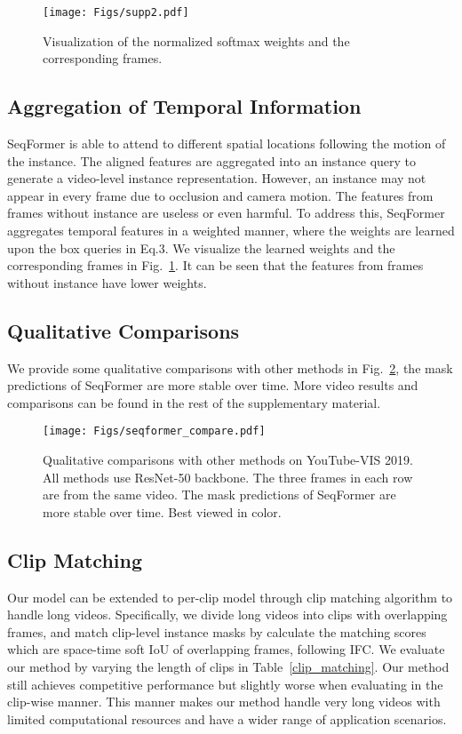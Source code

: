 \documentclass[runningheads]{llncs}
\begin{document}
\begin{figure}[h]
\centering
\texttt{[image: Figs/supp2.pdf]}
\caption{Visualization of the normalized softmax weights and the corresponding frames.}
\label{fig:temporal}
\end{figure}






\subsection{Aggregation of Temporal Information}
\label{sec:aggregation}

SeqFormer is able to attend to different spatial locations following the motion of the instance. 
The aligned features are aggregated into an instance query to generate a video-level instance representation.
However, an instance may not appear in every frame due to occlusion and camera motion.
The features from frames without instance are useless or even harmful.
To address this, SeqFormer aggregates temporal features in a weighted manner, where the weights are learned upon the box queries in Eq.3. 
We visualize the learned weights and the corresponding frames in Fig.~\ref{fig:temporal}.
It can be seen that the features from frames without instance have lower weights.





\subsection{Qualitative Comparisons}
We provide some qualitative comparisons with other methods in Fig.~\ref{fig:compare}, the mask predictions of SeqFormer are more stable over time. More video results and comparisons can be found in the rest of the supplementary material.


\begin{figure}[t]
\centering
\texttt{[image: Figs/seqformer\_compare.pdf]}
\caption{Qualitative comparisons with other methods on YouTube-VIS 2019.
All methods use ResNet-50 backbone.
The three frames in each row are from the same video. 
The mask predictions of SeqFormer are more stable over time.
Best viewed in color.}
\label{fig:compare}
\end{figure}

\subsection{Clip Matching}
Our model can be extended to per-clip model through clip matching algorithm to handle long videos.
Specifically, we divide long videos into clips with overlapping frames, and match clip-level instance masks by calculate the matching scores which are space-time soft IoU of overlapping frames, following IFC.
We evaluate our method by varying the length of clips in Table~\ref{clip_matching}. 
Our method still achieves competitive performance but slightly worse when evaluating in the clip-wise manner.
This manner makes our method handle very long videos with limited computational resources and have a wider range of application scenarios.
\end{document}
